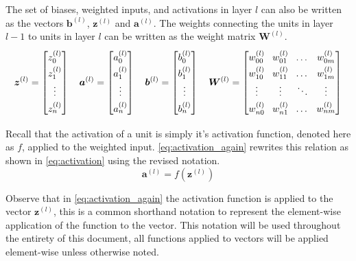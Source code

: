 The set of biases, weighted inputs, and activations in layer $l$ can also be written as the vectors $\bm{b}^{(l)}$, $\bm{z}^{(l)}$ and $\bm{a}^{(l)}$. The weights connecting the units in layer $l-1$ to units in layer $l$ can be written as the weight matrix $\bm{W}^{(l)}$.
\begin{equation*}
    \renewcommand{\arraystretch}{1.4}
    \setlength\arraycolsep{4pt}
    \bm{z}^{(l)} = \begin{bmatrix}
        z_{0}^{(l)} \\
        z_{1}^{(l)} \\
        \vdots \\
        z_{n}^{(l)}
    \end{bmatrix}
    \quad
    \bm{a}^{(l)} = \begin{bmatrix}
        a_{0}^{(l)} \\
        a_{1}^{(l)} \\
        \vdots \\
        a_{n}^{(l)}
    \end{bmatrix}
    \quad
    \bm{b}^{(l)} = \begin{bmatrix}
        b_{0}^{(l)} \\
        b_{1}^{(l)} \\
        \vdots \\
        b_{n}^{(l)}
    \end{bmatrix}
    \quad
    \bm{W}^{(l)} = \begin{bmatrix}
        w_{00}^{(l)} & w_{01}^{(l)} & \dots  & w_{0m}^{(l)} \\
        w_{10}^{(l)} & w_{11}^{(l)} & \dots  & w_{1m}^{(l)} \\
        \vdots       & \vdots       & \ddots & \vdots \\
        w_{n0}^{(l)} & w_{n1}^{(l)} & \dots  & w_{nm}^{(l)}
    \end{bmatrix}
\end{equation*}

Recall that the activation of a unit is simply it's activation function, denoted here as $f$, applied to the weighted input. \autoref{eq:activation_again} rewrites this relation as shown in \autoref{eq:activation} using the revised notation.
\begin{equation} \label{eq:activation_again}
    \bm{a}^{(l)} = f\left( \bm{z}^{(l)} \right)
\end{equation}

Observe that in \autoref{eq:activation_again} the activation function is applied to the vector $\bm{z}^{(l)}$, this is a common shorthand notation to represent the element-wise application of the function to the vector. This notation will be used throughout the entirety of this document, all functions applied to vectors will be applied element-wise unless otherwise noted.

